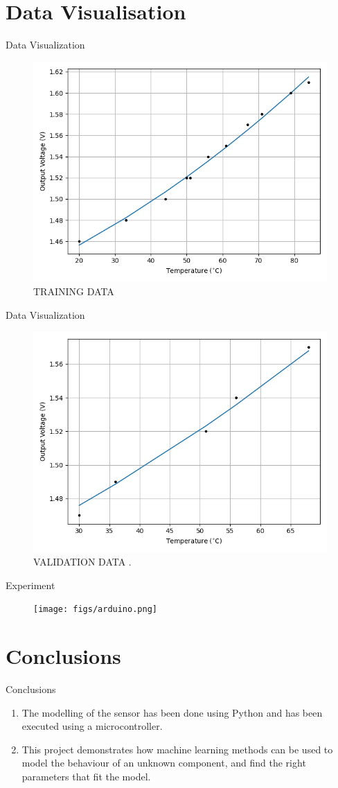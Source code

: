 \documentclass{beamer}
\theoremstyle{remark}
\begin{document}
\section{Data Visualisation}
 \begin{frame}{Data Visualization}
    \begin{figure}[!ht]
        \centering
        \includegraphics[width=0.6\columnwidth]{figs/train.png}
        \caption{TRAINING DATA}
        \label{fig:data}
    \end{figure}
\end{frame}

 \begin{frame}{Data Visualization}
    \begin{figure}[!ht]
        \centering
        \includegraphics[width=0.6\columnwidth]{figs/valid.png}
        \caption{VALIDATION DATA .}
        \label{fig:data}
    \end{figure}
\end{frame}
\begin{frame}{Experiment}
   \begin{figure}[!ht]
        \centering
        \texttt{[image: figs/arduino.png]}
    \end{figure}
\end{frame}
\section{Conclusions}
\begin{frame}{Conclusions}
\begin{enumerate}
\item The modelling of the sensor has been done using Python and has been executed using a microcontroller.
\item This project demonstrates how machine learning methods can be used to model the behaviour of an unknown component, and find the right parameters that fit the model.
\end{enumerate}
\end{frame}
\end{document}
